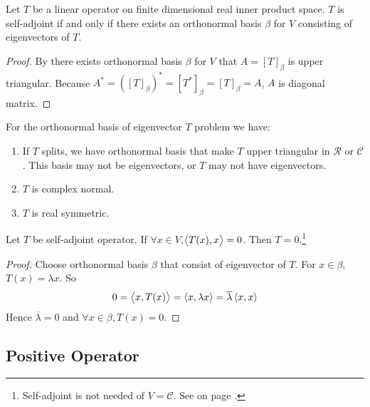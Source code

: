 \begin{theorem}\label{selfadjointmatrixhasorthonormalbasis}
    Let $T$ be a linear operator on finite dimensional real inner product space. $T$ is self-adjoint if and only if there exists an orthonormal basis $\beta$ for $V$ consisting of eigenvectors of $T$.    
\end{theorem}
\begin{proof}
    By  there exists orthonormal basis $\beta$ for $V$ that $A = [T]_\beta$ is upper triangular. Because $A^* = ([T]_\beta)^* = [T^*]_\beta = [T]_\beta = A$, $A$ is diagonal matrix.
\end{proof}


\begin{theorem}
    For the orthonormal basis of eigenvector $T$ problem we have:
    \begin{enumerate}
        \item If $T$ splits, we have orthonormal basis that make $T$ upper triangular in $\mathcal{R}$ or $\mathcal{C}$. This basis may not be eigenvectors, or $T$ may not have eigenvectors.
        \item $T$ is complex normal.
        \item $T$ is real symmetric.
    \end{enumerate}
\end{theorem}


\begin{theorem}\label{zerotforalltxforselfadjoint}
    Let $T$ be self-adjoint operator. If $\forall x \in V$,$\left\langle \displaystyle T(x), x \right\rangle = 0$. Then $T = 0$.\footnote{Self-adjoint is not needed of $V=\mathcal{C}$. See  on page \pageref{zerotforalltx}.}
\end{theorem}
\begin{proof}
    Choose orthonormal basis $\beta$ that consist of eigenvector of $T$. For $x\in \beta$, $T(x) =\lambda x$. So
    \begin{equation*}
        0 = \left\langle \displaystyle x, T(x) \right\rangle = \left\langle \displaystyle x, \lambda x \right\rangle = \overline{\lambda} \left\langle \displaystyle x, x \right\rangle
    \end{equation*}
    Hence $\overline{\lambda} = 0$ and $\forall x \in \beta,  T(x) = 0$.
\end{proof}


\subsection{Positive Operator}

